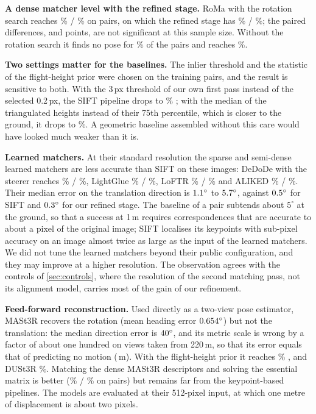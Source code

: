 \noindent\textbf{A dense matcher level with the refined stage.} RoMa with the rotation search reaches \gbRomaSRd\% \ci{\gbRomaSRdLo}{\gbRomaSRdHi} / \gbRomaSRe\% \ci{\gbRomaSReLo}{\gbRomaSReHi} on \gbRomaN{} pairs, on which the refined stage has \gbSiiOnRomaSRd\% / \gbSiiOnRomaSRe\%; the paired differences, \gbRomaVsIISRd{} \ci{\gbRomaVsIISRdLo}{\gbRomaVsIISRdHi} and \gbRomaVsIISRe{} \ci{\gbRomaVsIISReLo}{\gbRomaVsIISReHi} points, are not significant at this sample size. Without the rotation search it finds no pose for \gbRomaPlainFail\% of the pairs and reaches \gbRomaPlainSRd\%.

\noindent\textbf{Two settings matter for the baselines.} The inlier threshold and the statistic of the flight-height prior were chosen on the training pairs, and the result is sensitive to both. With the 3\,px threshold of our own first pass instead of the selected 0.2\,px, the SIFT pipeline drops to \gbSiftThrThreeSRd\% \SRd; with the median of the triangulated heights instead of their 75th percentile, which is closer to the ground, it drops to \gbSiftMedHeightSRd\%. A geometric baseline assembled without this care would have looked much weaker than it is.

\noindent\textbf{Learned matchers.} At their standard resolution the sparse and semi-dense learned matchers are less accurate than SIFT on these images: DeDoDe with the steerer reaches \gbDedodeSRd\% / \gbDedodeSRe\%, LightGlue \gbLgSRd\% / \gbLgSRe\%, LoFTR \gbLoftrSRd\% / \gbLoftrSRe\% and ALIKED \gbAlikedSRd\% / \gbAlikedSRe\%. Their median error on the translation direction is $1.1^\circ$ to $5.7^\circ$, against $0.5^\circ$ for SIFT and $0.3^\circ$ for our refined stage. The baseline of a pair subtends about $5^\circ$ at the ground, so that a success at 1\,m requires correspondences that are accurate to about a pixel of the original image; SIFT localises its keypoints with sub-pixel accuracy on an image almost twice as large as the input of the learned matchers. We did not tune the learned matchers beyond their public configuration, and they may improve at a higher resolution. The observation agrees with the controls of \cref{sec:controls}, where the resolution of the second matching pass, not its alignment model, carries most of the gain of our refinement.

\noindent\textbf{Feed-forward reconstruction.} Used directly as a two-view pose estimator, MASt3R recovers the rotation (mean heading error $0.654^\circ$) but not the translation: the median direction error is $40^\circ$, and its metric scale is wrong by a factor of about one hundred on views taken from 220\,m, so that its error equals that of predicting no motion (\gbMastNativeEPE\,m). With the flight-height prior it reaches \gbMastHeightSRd\% \SRd, and DUSt3R \gbDustHeightSRd\%. Matching the dense MASt3R descriptors and solving the essential matrix is better (\gbMastMatchSRd\% / \gbMastMatchSRe\% on \gbMastMatchN{} pairs) but remains far from the keypoint-based pipelines. The models are evaluated at their 512-pixel input, at which one metre of displacement is about two pixels.

